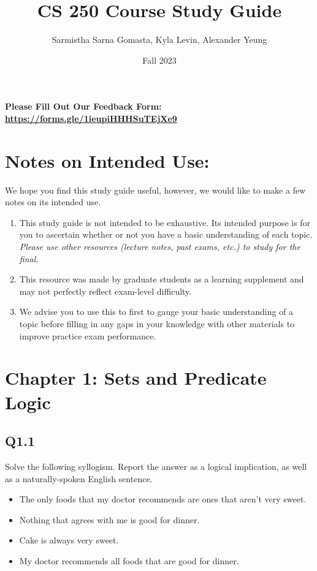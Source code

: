 \documentclass{article}
\title{CS 250 Course Study Guide}
\author{Sarmistha Sarna Gomasta, Kyla Levin, Alexander Yeung}
\date{Fall 2023}
\begin{document}
\maketitle
\begin{center}
    \textbf{Please Fill Out Our Feedback Form: \href{https://forms.gle/1ieupiHHHSuTEjXe9}{https://forms.gle/1ieupiHHHSuTEjXe9}}
\end{center}
\section*{Notes on Intended Use:}
We hope you find this study guide useful, however, we would like to make a few notes on its intended use. 
\begin{center}
    \begin{enumerate}
        \item This study guide is not intended to be exhaustive. Its intended purpose is for you to ascertain whether or not you have a basic understanding of each topic. \textit{Please use other resources (lecture notes, past exams, etc.) to study for the final.}
        \item This resource was made by graduate students as a learning supplement and may not perfectly reflect exam-level difficulty.
        \item We advise you to use this to first to gauge your basic understanding of a topic before filling in any gaps in your knowledge with other materials to improve practice exam performance.
    \end{enumerate}
    
\end{center}

\tableofcontents
\newpage



\section*{Chapter 1: Sets and Predicate Logic}
\subsection*{Q1.1}
Solve the following syllogism. Report the answer as a logical implication, as well as a naturally-spoken English sentence.
\begin{itemize}
    \item The only foods that my doctor recommends are ones that aren't very sweet.
    \item Nothing that agrees with me is good for dinner.
    \item Cake is always very sweet.
    \item My doctor recommends all foods that are good for dinner.
\end{itemize}
\newpage
\end{document}
